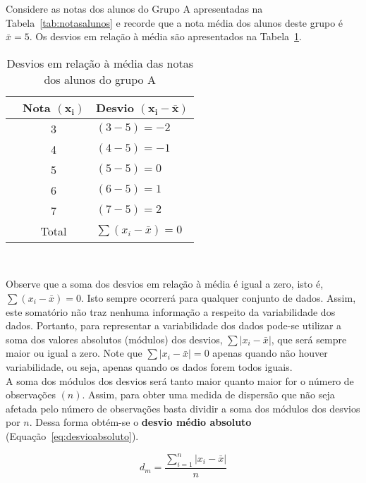 \documentclass[11pt,fleqn]{book} %
\begin{document}
\begin{example}

Considere as notas dos alunos do Grupo A apresentadas na Tabela~\ref{tab:notasalunos} e recorde que a nota média dos alunos deste grupo é $\bar{x}=5$. Os desvios em relação à média são apresentados na Tabela~\ref{tab:desvios}. \\

\begin{table}[h]
	\caption{Desvios em relação à média das notas dos alunos do grupo A}
	\label{tab:desvios} 
	\vspace{-0.1cm}
	\centering
	\begin{tabular}{l c l}
	\toprule
	& \textbf{Nota $\bm{(x_i)}$} & \textbf{Desvio $\bm{(x_i-\bar{x})}$} \\
	\midrule
	& 3 & $(3-5)=-2$ \\
	& 4 & $(4-5)=-1$ \\
	& 5 & $(5-5)=0$ \\
	& 6 & $(6-5)=1$ \\
	& 7 & $(7-5)=2$ \\
	\hline
	& Total & $\sum(x_i-\bar{x})=0$ \\
	\bottomrule
	\end{tabular} \\
\end{table}

\end{example}

Observe que a soma dos desvios em relação à média é igual a zero, isto é, $\sum(x_i-\bar{x})=0$. Isto sempre ocorrerá para qualquer conjunto de dados. Assim, este somatório não traz nenhuma informação a respeito da variabilidade dos dados. Portanto, para representar a variabilidade dos dados pode-se utilizar a soma dos valores absolutos (módulos) dos desvios, $\sum|x_i-\bar{x}|$, que será sempre maior ou igual a zero. Note que $\sum|x_i-\bar{x}|=0$ apenas quando não houver variabilidade, ou seja, apenas quando os dados forem todos iguais. \\


A soma dos módulos dos desvios será tanto maior quanto maior for o número de observações $(n)$. Assim, para obter uma medida de dispersão que não seja afetada pelo número de observações basta dividir a soma dos módulos dos desvios por $n$. Dessa forma obtém-se o {\bf desvio médio absoluto} (Equação~\ref{eq:desvioabsoluto}). \\

\begin{eBox}
\vspace{-0.5cm}
\begin{equation} \label{eq:desvioabsoluto}
d_m=\frac{\displaystyle\sum_{i=1}^{n}|x_i-\bar{x}|}{n} 
\end{equation}
\end{eBox}
\end{document}
